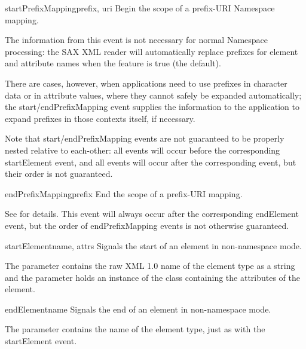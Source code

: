 \begin{methoddesc}[ContentHandler]{startPrefixMapping}{prefix, uri}
  Begin the scope of a prefix-URI Namespace mapping.
        
  The information from this event is not necessary for normal
  Namespace processing: the SAX XML reader will automatically replace
  prefixes for element and attribute names when the
   feature is true (the
  default).

  
  There are cases, however, when applications need to use prefixes in
  character data or in attribute values, where they cannot safely be
  expanded automatically; the start/endPrefixMapping event supplies
  the information to the application to expand prefixes in those
  contexts itself, if necessary.
  
  Note that start/endPrefixMapping events are not guaranteed to be
  properly nested relative to each-other: all
   events will occur before the
  corresponding startElement event, and all 
  events will occur after the corresponding  event,
  but their order is not guaranteed.
\end{methoddesc}

\begin{methoddesc}[ContentHandler]{endPrefixMapping}{prefix}
  End the scope of a prefix-URI mapping.
        
  See  for details. This event will always
  occur after the corresponding endElement event, but the order of
  endPrefixMapping events is not otherwise guaranteed.
\end{methoddesc}

\begin{methoddesc}[ContentHandler]{startElement}{name, attrs}
  Signals the start of an element in non-namespace mode.

  The  parameter contains the raw XML 1.0 name of the
  element type as a string and the  parameter holds an
  instance of the  class containing the attributes
  of the element.
\end{methoddesc}

\begin{methoddesc}[ContentHandler]{endElement}{name}
  Signals the end of an element in non-namespace mode.

  The  parameter contains the name of the element type, just
  as with the startElement event.
\end{methoddesc}

